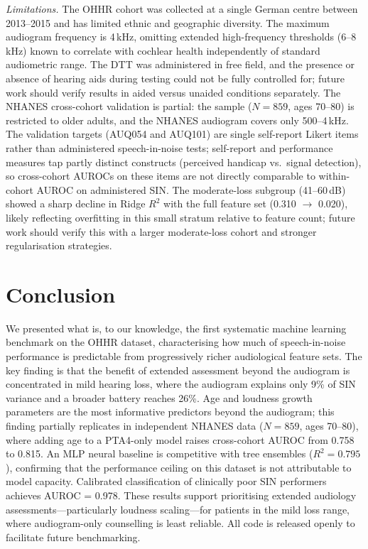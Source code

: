 \documentclass[conference]{IEEEtran}
\begin{document}
\textit{Limitations.}  The OHHR cohort was collected at a single German
centre between 2013--2015 and has limited ethnic and geographic diversity.
The maximum audiogram frequency is 4\,kHz, omitting extended high-frequency
thresholds (6--8\,kHz) known to correlate with cochlear health
independently of standard audiometric range.  The DTT was administered
in free field, and the presence or absence of hearing aids during testing
could not be fully controlled for; future work should verify results
in aided versus unaided conditions separately.  The NHANES cross-cohort validation is partial: the sample ($N=859$,
ages 70--80) is restricted to older adults, and the NHANES audiogram covers
only 500--4\,kHz.  The validation targets (AUQ054 and AUQ101) are single
self-report Likert items rather than administered speech-in-noise tests;
self-report and performance measures tap partly distinct constructs (perceived
handicap vs.\ signal detection), so cross-cohort AUROCs on these items are
not directly comparable to within-cohort AUROC on administered SIN.
The moderate-loss subgroup (41--60\,dB) showed a sharp decline in Ridge
$R^2$ with the full feature set (0.310 $\to$ 0.020), likely reflecting
overfitting in this small stratum relative to feature count; future work
should verify this with a larger moderate-loss cohort and stronger
regularisation strategies.

\section{Conclusion}

We presented what is, to our knowledge, the first systematic machine
learning benchmark on the OHHR dataset, characterising how much of
speech-in-noise performance is predictable from progressively richer
audiological feature sets.  The key finding is that the benefit of extended
assessment beyond the audiogram is concentrated in mild hearing loss, where
the audiogram explains only 9\% of SIN variance and a broader battery reaches
26\%.  Age and loudness growth parameters are the most informative predictors
beyond the audiogram; this finding partially replicates in independent NHANES
data ($N=859$, ages 70--80), where adding age to a PTA4-only model raises
cross-cohort AUROC from 0.758 to 0.815.  An MLP neural baseline is
competitive with tree ensembles ($R^2=0.795$),
confirming that the performance ceiling on this dataset is not attributable
to model capacity.  Calibrated classification of clinically poor SIN
performers achieves AUROC = 0.978.  These results support prioritising
extended audiology assessments---particularly loudness scaling---for
patients in the mild loss range, where audiogram-only counselling is least
reliable.  All code is released openly to facilitate future benchmarking.
\end{document}
